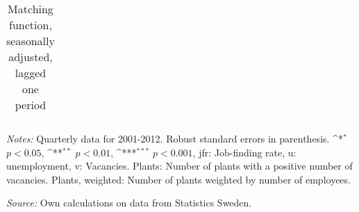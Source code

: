 \begin{table}[htbp]\centering
\def\sym#1{\ifmmode^{#1}\else\(^{#1}\)\fi}
\caption{Matching function, seasonally adjusted, lagged one period \label{tab:matchning_sa_lag}}
\begin{tabular*}{1\hsize}{@{\hskip\tabcolsep\extracolsep\fill}l*{3}{c}}
\toprule




\bottomrule
\end{tabular*}
   \begin{tablenotes}[flushleft]
      \small
\item \emph{Notes:} Quarterly data for 2001-2012. Robust standard errors in parenthesis. \sym{*} \(p<0.05\), \sym{**} \(p<0.01\), \sym{***} \(p<0.001\), jfr: Job-finding rate, u: unemployment, v: Vacancies. Plants: Number of plants with a positive number of vacancies. Plants, weighted: Number of plants weighted by number of employees. \\
\item  \emph{Source:} Own calculations on data from Statistics Sweden.
    \end{tablenotes}
\end{table}
